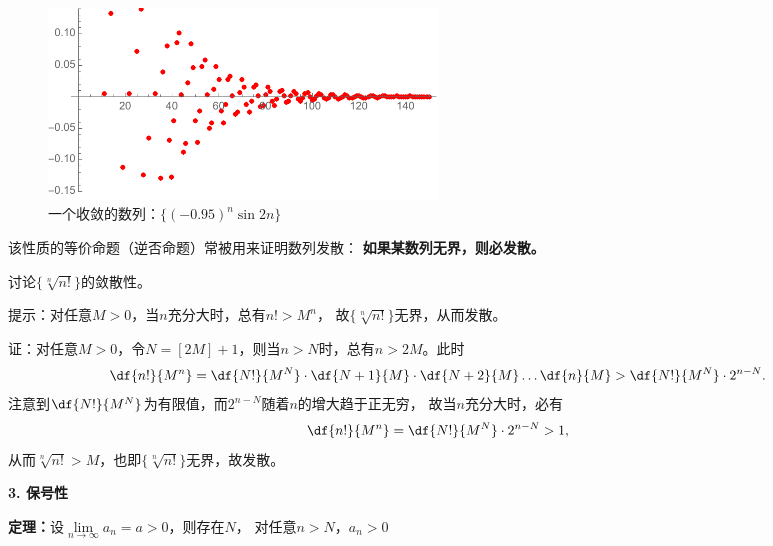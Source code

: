 \begin{figure}[h]
	\centering
	\includegraphics[width=0.5\textwidth]{./Images/Ch01/095nsin2n.pdf}
	\caption{一个收敛的数列：$\{(-0.95)^n\sin2n\}$}
	\label{fig:an-converge}
\end{figure}

该性质的等价命题（逆否命题）常被用来证明数列发散：
{\bf 如果某数列无界，则必发散。}

\begin{shaded}
	\egz 讨论$\{\sqrt[n]{n!}\}$的敛散性。

	提示：对任意$M>0$，当$n$充分大时，总有$n!>M^n$，
	故$\{\sqrt[n]{n!}\}$无界，从而发散。

	证：对任意$M>0$，令$N=[2M]+1$，则当$n>N$时，总有$n>2M$。此时
	$$\df{n!}{M^n}=\df{N!}{M^N}\cdot\df{N+1}{M}
	\cdot\df{N+2}{M}\ldots\df{n}{M}>\df{N!}{M^N}\cdot2^{n-N}.$$
	注意到$\df{N!}{M^N}$为有限值，而$2^{n-N}$随着$n$的增大趋于正无穷，
	故当$n$充分大时，必有
	$$\df{n!}{M^n}=\df{N!}{M^N}\cdot2^{n-N}>1,$$
	从而$\sqrt[n]{n!}>M$，也即$\{\sqrt[n]{n!}\}$无界，故发散。\fin
\end{shaded}

\bs
{\bf 3. 保号性}
\begin{thx}
	{\bf 定理：}设$\lim\limits_{n\to\infty}a_n=a>0$，则存在$N$，
	对任意$n>N$，$a_n>0$	
\end{thx}

